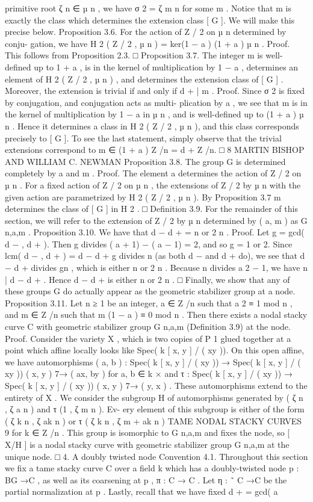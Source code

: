 \documentclass{article}
\begin{document}
primitive root ζ n ∈ µ n , we have σ 2 = ζ m n for some m . Notice that m is exactly the class which determines the extension class [ G ]. We will make this precise below. Proposition 3.6. For the action of Z / 2 on µ n determined by conju- gation, we have H 2 ( Z / 2 , µ n ) = ker(1 − a ) (1 + a ) µ n . Proof. This follows from Proposition 2.3. □ Proposition 3.7. The integer m is well-defined up to 1 + a , is in the kernel of multiplication by 1 − a , determines an element of H 2 ( Z / 2 , µ n ) , and determines the extension class of [ G ] . Moreover, the extension is trivial if and only if d + | m . Proof. Since σ 2 is fixed by conjugation, and conjugation acts as multi- plication by a , we see that m is in the kernel of multiplication by 1 − a in µ n , and is well-defined up to (1 + a ) µ n . Hence it determines a class in H 2 ( Z / 2 , µ n ), and this class corresponds precisely to [ G ]. To see the last statement, simply observe that the trivial extensions correspond to m ∈ (1 + a ) Z /n = d + Z /n. □ 8 MARTIN BISHOP AND WILLIAM C. NEWMAN Proposition 3.8. The group G is determined completely by a and m . Proof. The element a determines the action of Z / 2 on µ n . For a fixed action of Z / 2 on µ n , the extensions of Z / 2 by µ n with the given action are parametrized by H 2 ( Z / 2 , µ n ). By Proposition 3.7 m determines the class of [ G ] in H 2 . □ Definition 3.9. For the remainder of this section, we will refer to the extension of Z / 2 by µ n determined by ( a, m ) as G n,a,m . Proposition 3.10. We have that d − d + = n or 2 n . Proof. Let g = gcd( d − , d + ). Then g divides ( a + 1) − ( a − 1) = 2, and so g = 1 or 2. Since lcm( d − , d + ) = d − d + g divides n (as both d − and d + do), we see that d − d + divides gn , which is either n or 2 n . Because n divides a 2 − 1, we have n | d − d + . Hence d − d + is either n or 2 n . □ Finally, we show that any of these groups G do actually appear as the geometric stabilizer group at a node. Proposition 3.11. Let n ≥ 1 be an integer, a ∈ Z /n such that a 2 ≡ 1 mod n , and m ∈ Z /n such that m (1 − a ) ≡ 0 mod n . Then there exists a nodal stacky curve C with geometric stabilizer group G n,a,m (Definition 3.9) at the node. Proof. Consider the variety X , which is two copies of P 1 glued together at a point which affine locally looks like Spec( k [ x, y ] / ( xy )). On this open affine, we have automorphisms ( a, b ) : Spec( k [ x, y ] / ( xy )) → Spec( k [ x, y ] / ( xy )) ( x, y ) 7→ ( ax, by ) for a, b ∈ k × and τ : Spec( k [ x, y ] / ( xy )) → Spec( k [ x, y ] / ( xy )) ( x, y ) 7→ ( y, x ) . These automorphisms extend to the entirety of X . We consider the subgroup H of automorphisms generated by ( ζ n , ζ a n ) and τ (1 , ζ m n ). Ev- ery element of this subgroup is either of the form ( ζ k n , ζ ak n ) or τ ( ζ k n , ζ m + ak n ) TAME NODAL STACKY CURVES 9 for k ∈ Z /n . This group is isomorphic to G n,a,m and fixes the node, so [ X/H ] is a nodal stacky curve with geometric stabilizer group G n,a,m at the unique node. □ 4. A doubly twisted node Convention 4.1. Throughout this section we fix a tame stacky curve C over a field k which has a doubly-twisted node p : BG →C , as well as its coarsening at p , π : C → C . Let η : ˜ C →C be the partial normalization at p . Lastly, recall that we have fixed d + = gcd( a 
\end{document}
